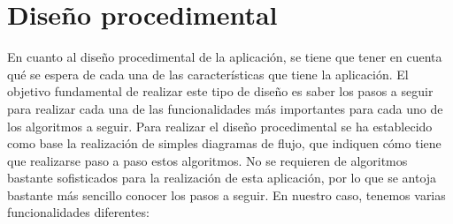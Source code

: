 \section{Diseño procedimental}
En cuanto al diseño procedimental de la aplicación, se tiene que tener en cuenta
qué se espera de cada una de las características que tiene la aplicación. El
objetivo fundamental de realizar este tipo de diseño es saber los pasos a seguir
para realizar cada una de las funcionalidades más importantes para cada uno de
los algoritmos a seguir. Para realizar el diseño procedimental se ha establecido
como base la realización de simples diagramas de flujo, que indiquen cómo tiene
que realizarse paso a paso estos algoritmos. No se requieren de algoritmos
bastante sofisticados para la realización de esta aplicación, por lo que se
antoja bastante más sencillo conocer los pasos a seguir. En nuestro caso,
tenemos varias funcionalidades diferentes:
